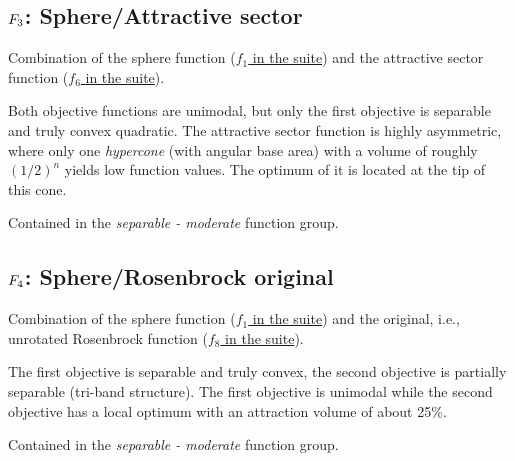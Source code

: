 \subsection[\texorpdfstring{\protect\(F_3\protect\): Sphere/Attractive sector}{F3: Sphere/Attractive sector}]{\texorpdfstring{\protect\(F_3\protect\): Sphere/Attractive sector}{}}
\label{index:f3}\label{index:sphere-attractive-sector}
Combination of the sphere function (\href{https://coco.gforge.inria.fr/downloads/download16.00/bbobdocfunctions.pdf\#page=5}{\(f_1\) in the \bbob suite})
and the attractive sector function (\href{https://coco.gforge.inria.fr/downloads/download16.00/bbobdocfunctions.pdf\#page=30}{\(f_6\) in the \bbob suite}).

Both objective functions are unimodal, but only the first objective is
separable and truly convex quadratic. The attractive sector
function is highly asymmetric, where only one \emph{hypercone} (with
angular base area) with a volume of roughly \((1/2)^n\)
yields low function values. The optimum of it is located at the tip
of this cone.

Contained in the \emph{separable - moderate} function group.



\subsection[\texorpdfstring{\protect\(F_4\protect\): Sphere/Rosenbrock original}{F4: Sphere/Rosenbrock original}]{\texorpdfstring{\protect\(F_4\protect\): Sphere/Rosenbrock original}{}}
\label{index:sphere-rosenbrock-original}\label{index:f4}
Combination of the sphere function (\href{https://coco.gforge.inria.fr/downloads/download16.00/bbobdocfunctions.pdf\#page=5}{\(f_1\) in the \bbob suite})
and the original, i.e., unrotated Rosenbrock function (\href{https://coco.gforge.inria.fr/downloads/download16.00/bbobdocfunctions.pdf\#page=40}{\(f_8\) in the \bbob suite}).

The first objective is separable and truly convex, the second
objective is partially separable (tri-band structure). The first
objective is unimodal while the second objective has a local
optimum with an attraction volume of about 25\%.

Contained in the \emph{separable - moderate} function group.



